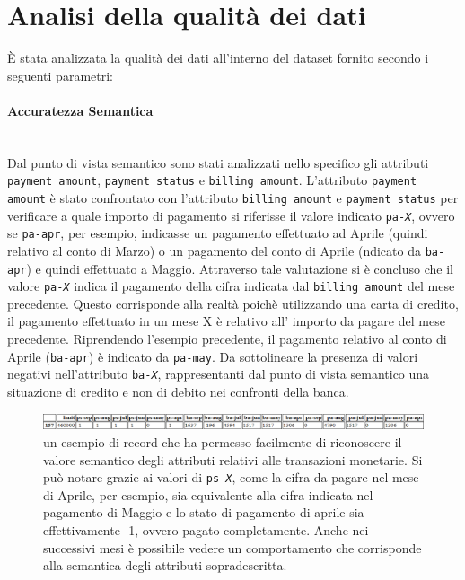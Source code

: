 \section{Analisi della qualit\`a dei dati}
\`E stata analizzata la qualit\`a dei dati all'interno del 
dataset fornito secondo i seguenti parametri:

\paragraph{Accuratezza Semantica}\mbox{}\\
Dal punto di vista semantico sono stati analizzati nello 
specifico gli attributi \texttt{payment amount},
\texttt{payment status} e \texttt{billing amount}.
L'attributo \texttt{payment amount} \`e stato confrontato
con l'attributo \texttt{billing amount} e \texttt{payment status}
per verificare a quale importo di pagamento si riferisse
il valore indicato \texttt{pa-\textit{X}}, ovvero
se \texttt{pa-apr}, per esempio, indicasse un pagamento
effettuato ad Aprile (quindi relativo al conto di Marzo) o
un pagamento del conto di Aprile (ndicato da \texttt{ba-apr})
e quindi effettuato a Maggio. Attraverso tale valutazione si
\`e concluso che il valore  \texttt{pa-\textit{X}} indica il
pagamento della cifra indicata dal \texttt{billing amount}
del mese precedente. Questo corrisponde alla realt\`a poich\`e
utilizzando una carta di credito, il pagamento effettuato in un
mese X \`e relativo all' importo da pagare del mese precedente.
Riprendendo l'esempio precedente, il pagamento relativo al conto
di Aprile (\texttt{ba-apr}) \`e indicato da \texttt{pa-may}. 
Da sottolineare la presenza di valori negativi nell'attributo
\texttt{ba-\textit{X}}, rappresentanti dal punto di vista semantico
una situazione di credito e non di debito nei confronti della banca.

\begin{figure}[H]
	\centering
	\includegraphics[width=\linewidth]{img/record-example.png}
	\caption[LOF entry]{
		un esempio di record che ha permesso
		facilmente di riconoscere il valore semantico degli attributi
		relativi alle transazioni monetarie. Si pu\`o notare grazie ai
		valori di \texttt{ps-\textit{X}}, come la cifra da pagare nel
		mese di Aprile, per esempio, sia equivalente alla cifra
		indicata nel pagamento di Maggio e lo stato di pagamento di
		aprile sia effettivamente -1, ovvero pagato completamente.
		Anche nei successivi mesi \`e possibile vedere un comportamento
		che corrisponde alla semantica degli attributi sopradescritta.
	}
	\label{record}
\end{figure}

